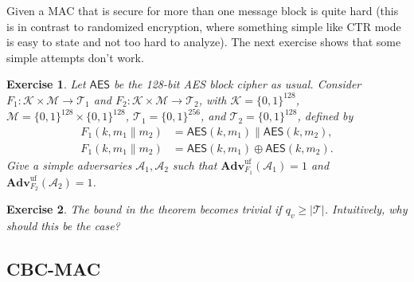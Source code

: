 \documentclass[11pt]{article}
\newtheorem{exercise}{Exercise}
\newcommand{\msgs}{\mathcal{M}}
\newcommand{\keys}{\mathcal{K}}
\newcommand{\tags}{\mathcal{T}}
\newcommand{\calA}{\mathcal{A}}
\newcommand{\AES}{\mathsf{AES}}
\newcommand{\Adv}{\mathbf{Adv}}
\newcommand{\bits}{\{0,1\}}
\newcommand{\AdvUF}[2]{\Adv^{\mathrm{uf}}_{#1}({#2})}
\begin{document}
Given a MAC that is secure for more than one message block is quite hard
(this is in contrast to randomized encryption, where something simple like CTR
mode is easy to state and not too hard to analyze). The next exercise shows
that some simple attempts don't work.
\begin{exercise}
    Let $\AES$ be the 128-bit AES block cipher as usual. Consider
    $F_1:\keys\times\msgs\to\tags_1$ and $F_2:\keys\times\msgs\to\tags_2$, with
    $\keys = \bits^{128}$, $\msgs=\bits^{128}\times\bits^{128}$,
    $\tags_1=\bits^{256}$, and $\tags_2=\bits^{128}$, defined by
    \begin{align*}
        F_1(k,m_1\|m_2) & = \AES(k,m_1)\|\AES(k,m_2),\\
        F_1(k,m_1\|m_2) & = \AES(k,m_1)\oplus\AES(k,m_2).
    \end{align*}
    Give a simple adversaries $\calA_1,\calA_2$ such that 
    $\AdvUF{F_1}{\calA_1}=1$
    and 
    $\AdvUF{F_2}{\calA_2}=1$.
\end{exercise}

\begin{exercise}
    The bound in the theorem becomes trivial if $q_v \geq |\tags|$. Intuitively,
    why should this be the case?
\end{exercise}

\subsection{CBC-MAC} 
\end{document}
